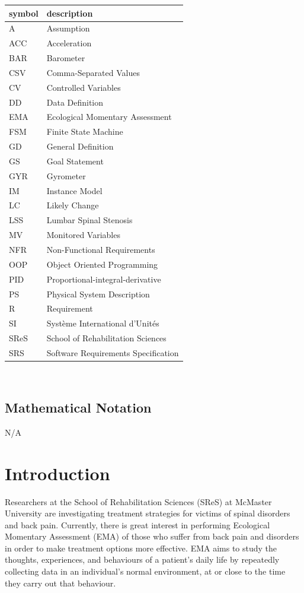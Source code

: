 \documentclass[12pt]{article}
\begin{document}
\begin{tabular}{l l} 
  \toprule		
  \textbf{symbol} & \textbf{description}\\
  \midrule 
  A & Assumption\\
  ACC & Acceleration\\
  BAR & Barometer\\
  CSV & Comma-Separated Values\\
  CV & Controlled Variables\\
  DD & Data Definition\\
  EMA & Ecological Momentary Assessment\\
  FSM & Finite State Machine\\
  GD & General Definition\\
  GS & Goal Statement\\
  GYR & Gyrometer\\
  IM & Instance Model\\
  LC & Likely Change\\
  LSS & Lumbar Spinal Stenosis\\
  MV & Monitored Variables\\
  NFR & Non-Functional Requirements\\
  OOP & Object Oriented Programming\\
  PID & Proportional-integral-derivative\\
  PS & Physical System Description\\
  R & Requirement\\
  SI & Syst\`{e}me International d'Unit\'{e}s\\
  SReS & School of Rehabilitation Sciences\\
  SRS & Software Requirements Specification\\

  \bottomrule
\end{tabular}\\

\subsection{Mathematical Notation}
N/A


\section{Introduction}

Researchers at the School of Rehabilitation Sciences (SReS) at McMaster University are investigating treatment strategies for victims of spinal disorders and back pain. Currently, there is great interest in performing Ecological Momentary Assessment (EMA) of those who suffer from back pain and disorders in order to make treatment options more effective. EMA aims to study the thoughts, experiences, and behaviours of a patient's daily life by repeatedly collecting data in an individual's normal environment, at or close to the time they carry out that behaviour.\\
\end{document}
